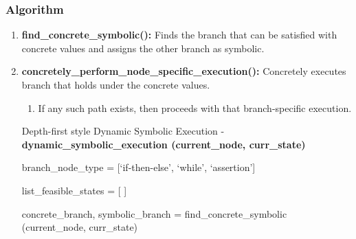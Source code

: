 \documentclass[11pt]{llncs}
\begin{document}
		\vspace{-5mm}

		\subsubsection{Algorithm}

			\begin{enumerate}
				\vspace{-2mm}
				\item \textbf{find\_concrete\_symbolic():}  Finds the branch that can be satisfied with concrete values and assigns the other branch as symbolic.

				\item \textbf{concretely\_perform\_node\_specific\_execution():}  Concretely executes branch that holds under the concrete values.
					\begin{enumerate}
						\item If any such path exists, then proceeds with that branch-specific execution.
					\end{enumerate}


				\begin{algorithm}[H]
					\caption{Depth-first style Dynamic Symbolic Execution - \textbf{ dynamic\_symbolic\_execution (current\_node, curr\_state)}}  \label{algorithm_8}
					
					\DontPrintSemicolon
					\SetAlgoLined
					
					
					\;
					
					branch\_node\_type = [‘if-then-else’, ‘while’, ‘assertion’]
	               
					\vspace{1mm}
	
	              			list\_feasible\_states = [ ]
	
					\vspace{3mm}
					
					 {
						concrete\_branch, symbolic\_branch = find\_concrete\_symbolic (current\_node, curr\_state)
	
						\vspace{1mm}
		
}
\end{algorithm}
\end{enumerate}
\end{document}
